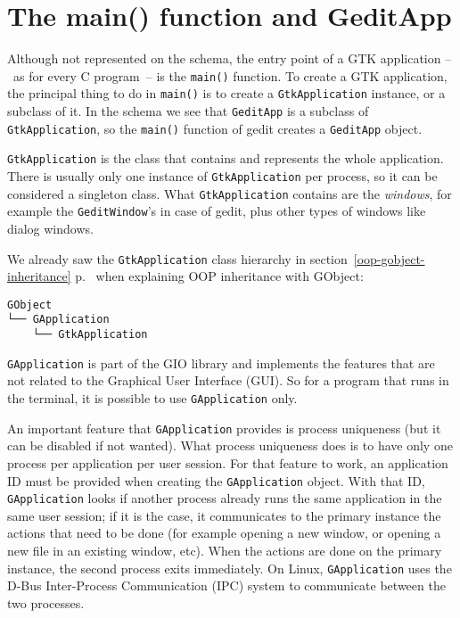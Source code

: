 \section{The main() function and GeditApp}

Although not represented on the schema, the entry point of a GTK application --~as for every C program~-- is the \lstinline{main()} function. To create a GTK application, the principal thing to do in \lstinline{main()} is to create a \lstinline{GtkApplication} instance, or a subclass of it. In the schema we see that \lstinline{GeditApp} is a subclass of \lstinline{GtkApplication}, so the \lstinline{main()} function of gedit creates a \lstinline{GeditApp} object.

\lstinline{GtkApplication} is the class that contains and represents the whole application. There is usually only one instance of \lstinline{GtkApplication} per process, so it can be considered a singleton class. What \lstinline{GtkApplication} contains are the \emph{windows}, for example the \lstinline{GeditWindow}'s in case of gedit, plus other types of windows like dialog windows.

We already saw the \lstinline{GtkApplication} class hierarchy in section~\ref{oop-gobject-inheritance} p.~\pageref{oop-gobject-inheritance} when explaining OOP inheritance with GObject:

\begin{verbatim}
GObject
└── GApplication
    └── GtkApplication
\end{verbatim}

\lstinline{GApplication} is part of the GIO library and implements the features that are not related to the Graphical User Interface (GUI). So for a program that runs in the terminal, it is possible to use \lstinline{GApplication} only.

An important feature that \lstinline{GApplication} provides is process uniqueness (but it can be disabled if not wanted). What process uniqueness does is to have only one process per application per user session. For that feature to work, an application ID must be provided when creating the \lstinline{GApplication} object. With that ID, \lstinline{GApplication} looks if another process already runs the same application in the same user session; if it is the case, it communicates to the primary instance the actions that need to be done (for example opening a new window, or opening a new file in an existing window, etc). When the actions are done on the primary instance, the second process exits immediately. On Linux, \lstinline{GApplication} uses the D-Bus Inter-Process Communication (IPC) system to communicate between the two processes.

